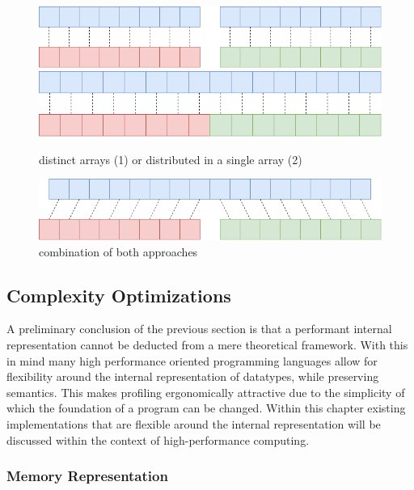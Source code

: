 \documentclass{article}
\begin{document}
\begin{figure}[ht]
    \centering
    \includegraphics[scale=0.3]{variant1}
    \hspace{10pt}
    \includegraphics[scale=0.3]{variant2}
    \caption{distinct arrays (1) or distributed in a single array (2)}
\end{figure}

\begin{figure}[ht]
    \centering
    \includegraphics[scale=0.3]{variant3}
    \caption{combination of both approaches}
\end{figure}

\newpage

\subsection{Complexity Optimizations}

A preliminary conclusion of the previous section is that a performant internal representation cannot be deducted from a mere theoretical framework.
With this in mind many high performance oriented programming languages allow for flexibility around the internal representation of datatypes, while preserving semantics.
This makes profiling ergonomically attractive due to the simplicity of which the foundation of a program can be changed. 
Within this chapter existing implementations that are flexible around the internal representation will be discussed within the context of high-performance computing. 

\subsubsection{Memory Representation}
\end{document}

